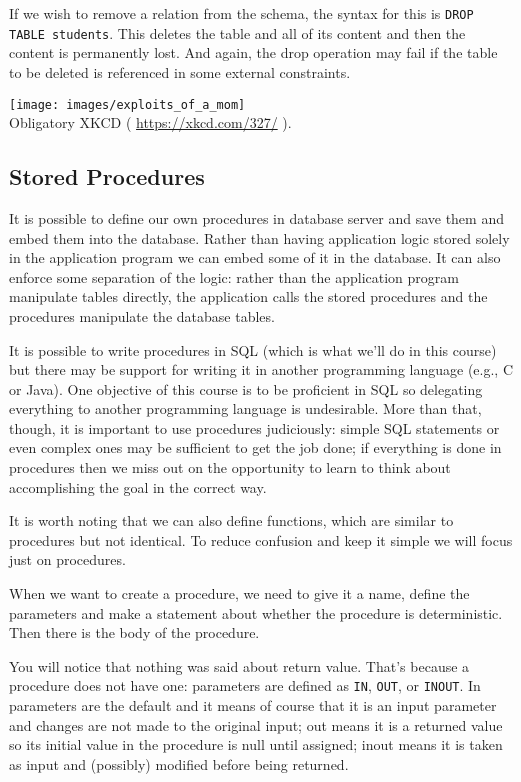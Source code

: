 If we wish to remove a relation from the schema, the syntax for this is \texttt{DROP TABLE students}. This deletes the table and all of its content and then the content is permanently lost. And again, the drop operation may fail if the table to be deleted is referenced in some external constraints.

\begin{center}
\texttt{[image: images/exploits\_of\_a\_mom]}\\
Obligatory XKCD ( \url{https://xkcd.com/327/} ).
\end{center}

\subsection*{Stored Procedures}
It is possible to define our own procedures in database server and save them and embed them into the database. Rather than having application logic stored solely in the application program we can embed some of it in the database. It can also enforce some separation of the logic: rather than the application program manipulate tables directly, the application calls the stored procedures and the procedures manipulate the database tables.

It is possible to write procedures in SQL (which is what we'll do in this course) but there may be support for writing it in another programming language (e.g., C or Java). One objective of this course is to be proficient in SQL so delegating everything to another programming language is undesirable. More than that, though, it is important to use procedures judiciously: simple SQL statements or even complex ones may be sufficient to get the job done; if everything is done in procedures then we miss out on the opportunity to learn to think about accomplishing the goal in the correct way. 

It is worth noting that we can also define functions, which are similar to procedures but not identical. To reduce confusion and keep it simple we will focus just on procedures. 

When we want to create a procedure, we need to give it a name, define the parameters and make a statement about whether the procedure is deterministic. Then there is the body of the procedure.

You will notice that nothing was said about return value. That's because a procedure does not have one: parameters are defined as \texttt{IN}, \texttt{OUT}, or \texttt{INOUT}. In parameters are the default and it means of course that it is an input parameter and changes are not made to the original input; out means it is a returned value so its initial value in the procedure is null until assigned; inout means it is taken as input and (possibly) modified before being returned.

